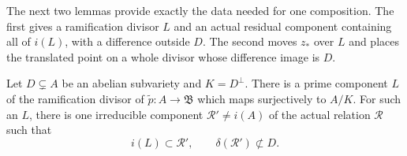 The next two lemmas provide exactly the data needed for one
composition.  The first gives a ramification divisor \(L\) and an
actual residual component containing all of \(i(L)\), with a
difference outside \(D\).  The second moves \(z_*\) over \(L\) and
places the translated point on a whole divisor whose difference
image is \(D\).

\begin{lemma}
\label{quot:ramification}
Let \(D\subsetneq A\) be an abelian subvariety and \(K=D^\perp\).
There is a prime component \(L\) of the ramification divisor of
\(\widetilde p:A\to\mathfrak B\) which maps surjectively to \(A/K\).
For such an \(L\), there is one irreducible component
\(\mathcal R'\ne i(A)\) of the actual relation \(\mathcal R\) such that
\[
                       i(L)\subset\mathcal R',
              \qquad   \delta(\mathcal R')\not\subset D .
\]
\end{lemma}

